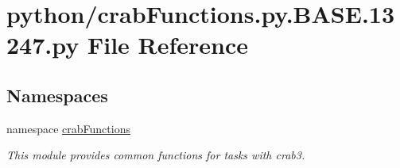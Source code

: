 \section{python/crabFunctions.py.BASE.13247.py File Reference}
\label{crabFunctions_8py_8BASE_813247_8py}
\subsection*{Namespaces}
\begin{DoxyCompactItemize}
\item 
namespace \hyperlink{namespacecrabFunctions}{crabFunctions}


\begin{DoxyCompactList}\small\item\em This module provides common functions for tasks with crab3. \item\end{DoxyCompactList}\end{DoxyCompactItemize}
